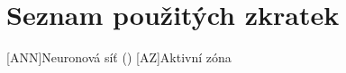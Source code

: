 \section*{Seznam použitých zkratek}
\begin{acronym}[TDMA]
[ANN]{Neuronová síť ()}
[AZ]{Aktivní zóna}
\end{acronym}
